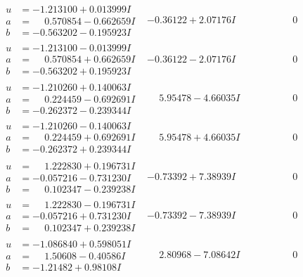 \documentclass[1p]{elsarticle_modified}
\theoremstyle{definition}
\begin{document}
$$\begin{array}{c|c|c}
\begin{aligned}
u &= -1.213100 + 0.013999 I \\
a &= \phantom{-}0.570854 - 0.662659 I \\
b &= -0.563202 - 0.195923 I\end{aligned}
 & -0.36122 + 2.07176 I & \phantom{-0.000000 } 0 \\ \hline\begin{aligned}
u &= -1.213100 - 0.013999 I \\
a &= \phantom{-}0.570854 + 0.662659 I \\
b &= -0.563202 + 0.195923 I\end{aligned}
 & -0.36122 - 2.07176 I & \phantom{-0.000000 } 0 \\ \hline\begin{aligned}
u &= -1.210260 + 0.140063 I \\
a &= \phantom{-}0.224459 - 0.692691 I \\
b &= -0.262372 - 0.239344 I\end{aligned}
 & \phantom{-}5.95478 - 4.66035 I & \phantom{-0.000000 } 0 \\ \hline\begin{aligned}
u &= -1.210260 - 0.140063 I \\
a &= \phantom{-}0.224459 + 0.692691 I \\
b &= -0.262372 + 0.239344 I\end{aligned}
 & \phantom{-}5.95478 + 4.66035 I & \phantom{-0.000000 } 0 \\ \hline\begin{aligned}
u &= \phantom{-}1.222830 + 0.196731 I \\
a &= -0.057216 - 0.731230 I \\
b &= \phantom{-}0.102347 - 0.239238 I\end{aligned}
 & -0.73392 + 7.38939 I & \phantom{-0.000000 } 0 \\ \hline\begin{aligned}
u &= \phantom{-}1.222830 - 0.196731 I \\
a &= -0.057216 + 0.731230 I \\
b &= \phantom{-}0.102347 + 0.239238 I\end{aligned}
 & -0.73392 - 7.38939 I & \phantom{-0.000000 } 0 \\ \hline\begin{aligned}
u &= -1.086840 + 0.598051 I \\
a &= \phantom{-}1.50608 - 0.40586 I \\
b &= -1.21482 + 0.98108 I\end{aligned}
 & \phantom{-}2.80968 - 7.08642 I & \phantom{-0.000000 } 0 \\ \hline\begin{aligned}

\end{aligned}
\end{array}$$
\end{document}
